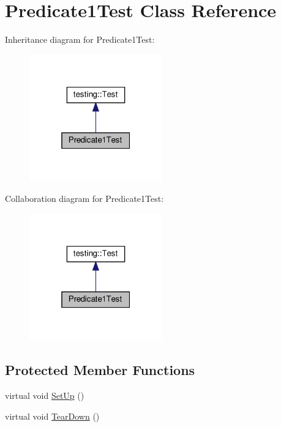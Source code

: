\hypertarget{class_predicate1_test}{}\section{Predicate1\+Test Class Reference}
\label{class_predicate1_test}


Inheritance diagram for Predicate1\+Test\+:
\nopagebreak
\begin{figure}[H]
\begin{center}
\leavevmode
\includegraphics[width=163pt]{class_predicate1_test__inherit__graph}
\end{center}
\end{figure}


Collaboration diagram for Predicate1\+Test\+:
\nopagebreak
\begin{figure}[H]
\begin{center}
\leavevmode
\includegraphics[width=163pt]{class_predicate1_test__coll__graph}
\end{center}
\end{figure}
\subsection*{Protected Member Functions}
\begin{DoxyCompactItemize}
\item 
virtual void \hyperlink{class_predicate1_test_a481704a09f73a37158513f9a336dbdd9}{Set\+Up} ()
\item 
virtual void \hyperlink{class_predicate1_test_ad2974af5c6abc508847c3a9912b24a90}{Tear\+Down} ()
\end{DoxyCompactItemize}
